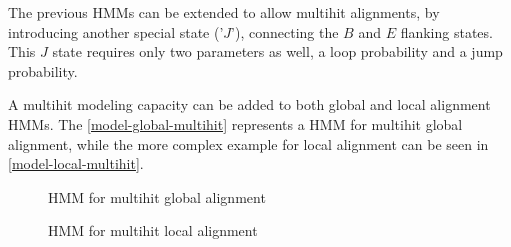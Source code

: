 The previous HMMs can be extended to allow multihit alignments, by introducing another special state ('$J$'), connecting the $B$ and $E$ flanking states. This $J$ state requires only two parameters as well, a loop probability and a jump probability.

A multihit modeling capacity can be added to both global and local alignment HMMs. The \autoref{model-global-multihit} represents a HMM for multihit global alignment, while the more complex example for local alignment can be seen in \autoref{model-local-multihit}.

\begin{figure}[htb!]
  \begin{center}
    \caption{HMM for multihit global alignment}  
    \label{model-global-multihit}
  \end{center}
\end{figure}


\begin{figure}[htb!]
  \begin{center}
    \caption{HMM for multihit local alignment}  
    \label{model-local-multihit}
  \end{center}
\end{figure}

